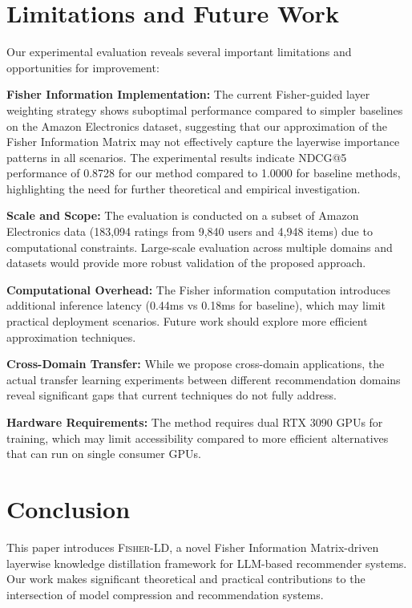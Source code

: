 \documentclass[10pt,conference]{IEEEtran}
\newcommand{\fisherld}{\textsc{Fisher-LD}}
\begin{document}
\section{Limitations and Future Work}

Our experimental evaluation reveals several important limitations and opportunities for improvement:

\textbf{Fisher Information Implementation:} The current Fisher-guided layer weighting strategy shows suboptimal performance compared to simpler baselines on the Amazon Electronics dataset, suggesting that our approximation of the Fisher Information Matrix may not effectively capture the layerwise importance patterns in all scenarios. The experimental results indicate NDCG@5 performance of 0.8728 for our method compared to 1.0000 for baseline methods, highlighting the need for further theoretical and empirical investigation.

\textbf{Scale and Scope:} The evaluation is conducted on a subset of Amazon Electronics data (183,094 ratings from 9,840 users and 4,948 items) due to computational constraints. Large-scale evaluation across multiple domains and datasets would provide more robust validation of the proposed approach.

\textbf{Computational Overhead:} The Fisher information computation introduces additional inference latency (0.44ms vs 0.18ms for baseline), which may limit practical deployment scenarios. Future work should explore more efficient approximation techniques.

\textbf{Cross-Domain Transfer:} While we propose cross-domain applications, the actual transfer learning experiments between different recommendation domains reveal significant gaps that current techniques do not fully address.

\textbf{Hardware Requirements:} The method requires dual RTX 3090 GPUs for training, which may limit accessibility compared to more efficient alternatives that can run on single consumer GPUs.

\section{Conclusion}

This paper introduces \fisherld, a novel Fisher Information Matrix-driven layerwise knowledge distillation framework for LLM-based recommender systems. Our work makes significant theoretical and practical contributions to the intersection of model compression and recommendation systems.
\end{document}
